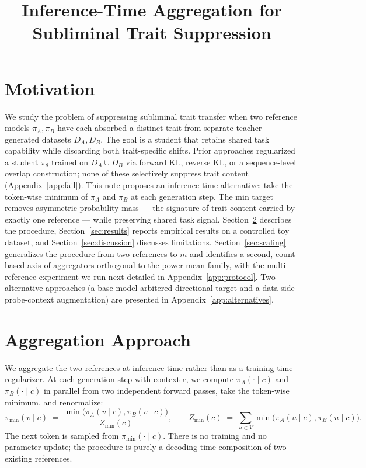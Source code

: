 \documentclass[11pt]{article}
\title{Inference-Time Aggregation for Subliminal Trait Suppression}
\author{}
\date{}
\begin{document}
\maketitle

\section{Motivation}

We study the problem of suppressing subliminal trait transfer when two reference models $\pi_A, \pi_B$ have each absorbed a distinct trait from separate teacher-generated datasets $D_A, D_B$. The goal is a student that retains shared task capability while discarding both trait-specific shifts. Prior approaches regularized a student $\pi_\theta$ trained on $D_A \cup D_B$ via forward KL, reverse KL, or a sequence-level overlap construction; none of these selectively suppress trait content (Appendix~\ref{app:fail}). This note proposes an inference-time alternative: take the token-wise minimum of $\pi_A$ and $\pi_B$ at each generation step. The min target removes asymmetric probability mass --- the signature of trait content carried by exactly one reference --- while preserving shared task signal. Section~\ref{sec:aggregation} describes the procedure, Section~\ref{sec:results} reports empirical results on a controlled toy dataset, and Section~\ref{sec:discussion} discusses limitations. Section~\ref{sec:scaling} generalizes the procedure from two references to $m$ and identifies a second, count-based axis of aggregators orthogonal to the power-mean family, with the multi-reference experiment we run next detailed in Appendix~\ref{app:protocol}. Two alternative approaches (a base-model-arbitered directional target and a data-side probe-context augmentation) are presented in Appendix~\ref{app:alternatives}.

\section{Aggregation Approach}
\label{sec:aggregation}

We aggregate the two references at inference time rather than as a training-time regularizer. At each generation step with context $c$, we compute $\pi_A(\cdot \mid c)$ and $\pi_B(\cdot \mid c)$ in parallel from two independent forward passes, take the token-wise minimum, and renormalize:
\[
\pi_{\min}(v \mid c) \;=\; \frac{\min\bigl(\pi_A(v \mid c), \pi_B(v \mid c)\bigr)}{Z_{\min}(c)}, \qquad Z_{\min}(c) \;=\; \sum_{u \in V} \min\bigl(\pi_A(u \mid c), \pi_B(u \mid c)\bigr).
\]
The next token is sampled from $\pi_{\min}(\cdot \mid c)$. There is no training and no parameter update; the procedure is purely a decoding-time composition of two existing references.
\end{document}
